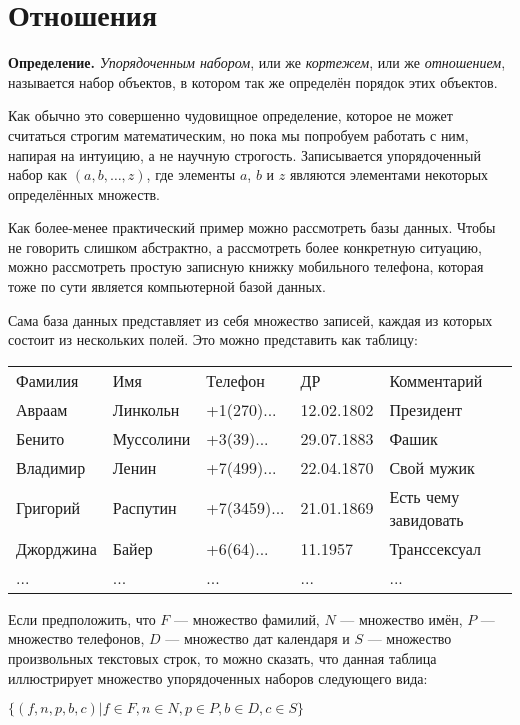 \section{Отношения}

{\bfseries Определение.} {\slshape Упорядоченным набором}, или же {\slshape кортежем}, или же {\slshape отношением}, называется набор объектов, в котором так же определён порядок этих объектов.

Как обычно это совершенно чудовищное определение, которое не может считаться строгим математическим, но пока мы попробуем работать с ним, напирая на интуицию, а не научную строгость. Записывается упорядоченный набор как $(a, b, \ldots, z)$, где элементы $a$, $b$ и $z$ являются элементами некоторых определённых множеств.

Как более-менее практический пример можно рассмотреть базы данных. Чтобы не говорить слишком абстрактно, а рассмотреть более конкретную ситуацию, можно рассмотреть простую записную книжку мобильного телефона, которая тоже по сути является компьютерной базой данных.

Сама база данных представляет из себя множество записей, каждая из которых состоит из нескольких полей. Это можно представить как таблицу:

\begin{table}[h]
\begin{tabular}{lllll}
Фамилия & Имя & Телефон & ДР & Комментарий\\
Авраам & Линкольн & +1(270)... & 12.02.1802 & Президент\\
Бенито & Муссолини & +3(39)... & 29.07.1883 & Фашик\\
Владимир & Ленин & +7(499)... & 22.04.1870 & Свой мужик\\
Григорий & Распутин & +7(3459)... & 21.01.1869 & Есть чему завидовать\\
Джорджина & Байер & +6(64)... & 11.1957 & Транссексуал\\
... & ... & ... & ... & ...
\end{tabular}
\end{table}

Если предположить, что $F$ — множество фамилий, $N$ — множество имён, $P$ — множество телефонов, $D$ — множество дат календаря и $S$ — множество произвольных текстовых строк, то можно сказать, что данная таблица иллюстрирует множество упорядоченных наборов следующего вида:

$\{(f, n, p, b, c)|f\in F, n \in N, p \in P, b \in D, c \in S\}$

